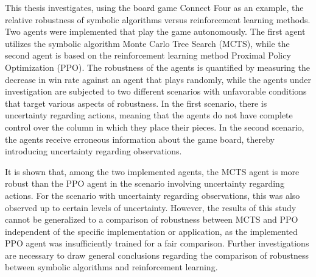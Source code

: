 This thesis investigates, using the board game Connect Four as an example, the relative robustness of symbolic algorithms versus reinforcement learning methods. Two agents were implemented that play the game autonomously. The first agent utilizes the symbolic algorithm Monte Carlo Tree Search (MCTS), while the second agent is based on the reinforcement learning method Proximal Policy Optimization (PPO). The robustness of the agents is quantified by measuring the decrease in win rate against an agent that plays randomly, while the agents under investigation are subjected to two different scenarios with unfavorable conditions that target various aspects of robustness. In the first scenario, there is uncertainty regarding actions, meaning that the agents do not have complete control over the column in which they place their pieces. In the second scenario, the agents receive erroneous information about the game board, thereby introducing uncertainty regarding observations.

It is shown that, among the two implemented agents, the MCTS agent is more robust than the PPO agent in the scenario involving uncertainty regarding actions. For the scenario with uncertainty regarding observations, this was also observed up to certain levels of uncertainty. However, the results of this study cannot be generalized to a comparison of robustness between MCTS and PPO independent of the specific implementation or application, as the implemented PPO agent was insufficiently trained for a fair comparison. Further investigations are necessary to draw general conclusions regarding the comparison of robustness between symbolic algorithms and reinforcement learning.

\newpage